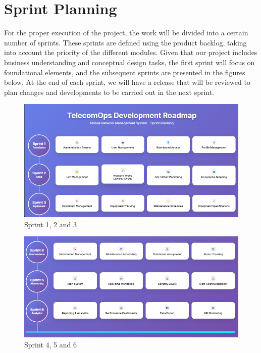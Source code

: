 \section{Sprint Planning}\vspace{1cm}
For the proper execution of the project, the work will be divided into a certain number of sprints. These sprints are defined using the product backlog, taking into account the priority of the different modules. Given that our project includes business understanding and conceptual design tasks, the first sprint will focus on foundational elements, and the subsequent sprints are presented in the figures below. At the end of each sprint, we will have a release that will be reviewed to plan changes and developments to be carried out in the next sprint.\newline
\begin{figure}[hbt! ]
    \centering
    \includegraphics[width=1\linewidth]{img/chap_02/sprints_1_2_3.png}
    \caption{Sprint 1, 2 and 3}
    \label{fig:sprints_123}
\end{figure}
\begin{figure}[hbt!]
    \centering
    \includegraphics[width=1\linewidth]{img/chap_02/sprints_4_5_6.png}
    \caption{Sprint 4, 5 and 6}
    \label{fig:sprints_456}
\end{figure}\newpage

